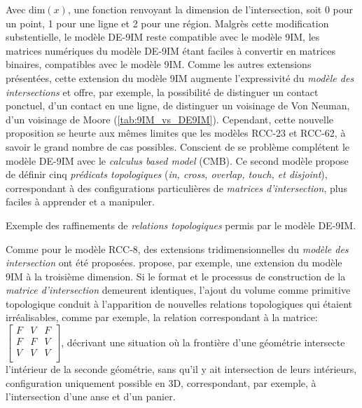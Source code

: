Avec \(\text{dim}(x)\), une fonction renvoyant la dimension de
l'intersection, soit 0 pour un point, 1 pour une ligne et 2 pour une
région. Malgrès cette modification substentielle, le modèle DE-9IM
reste compatible avec le modèle 9IM, les matrices numériques du modèle
DE-9IM étant faciles à convertir en matrices binaires, compatibles
avec le modèle 9IM. Comme les autres extensions présentées, cette
extension du modèle 9IM augmente l'expressivité du \emph{modèle des
  intersections} et offre, par exemple, la possibilité de distinguer
un contact ponctuel, d'un contact en une ligne, \ie de distinguer un
voisinage de Von Neuman, d'un voisinage de Moore
(\autoref{tab:9IM_vs_DE9IM}). Cependant, cette nouvelle proposition se
heurte aux mêmes limites que les modèles RCC-23 et RCC-62, à savoir le
grand nombre de cas possibles. Conscient de se problème
\textcite{Clementini1993} complétent le modèle DE-9IM avec le
\emph{calculus based model} (CMB). Ce second modèle propose de définir
cinq \emph{prédicats topologiques} (\emph{in, cross, overlap, touch,
  et disjoint}), correspondant à des configurations particulières de
\emph{matrices d'intersection}, plus faciles à apprender et a
manipuler.

\begin{table}
  \centering
  \caption{Exemple des raffinements de \emph{relations topologiques}
    permis par le modèle DE-9IM.}
  \label{tab:9IM_vs_DE9IM}
\end{table}

Comme pour le modèle RCC-8, des extensions tridimensionnelles du
\emph{modèle des intersection} ont été
proposées. \textcite{DelaLosa2000} propose, par exemple, une extension
du modèle 9IM à la troisième dimension. Si le format et le processus
de construction de la \emph{matrice d'intersection} demeurent
identiques, l'ajout du volume comme primitive topologique conduit à
l'apparition de nouvelles relations topologiques qui étaient
irréalisables, comme par exemple, la relation correspondant à la
matrice: 
%
\(\left[
  \begin{smallmatrix}
    F&V&F\\
    F&F&V\\
    V&V&V\\
  \end{smallmatrix}
\right]\),
%
décrivant une situation où la frontière d'une géométrie intersecte
l'intérieur de la seconde géométrie, sans qu'il y ait intersection de
leurs intérieurs, configuration uniquement possible en 3D,
correspondant, par exemple, à l'intersection d'une anse et d'un
panier.

